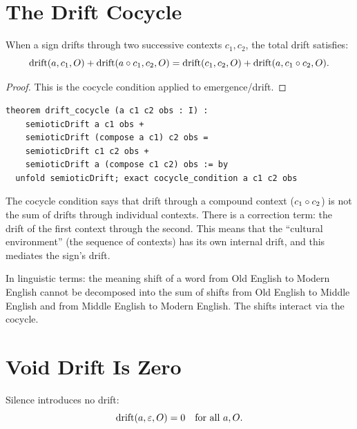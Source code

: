 \section{The Drift Cocycle}

\begin{theorem}
\label{thm:drift-cocycle}
When a sign drifts through two successive contexts $c_1, c_2$,
the total drift satisfies:
\[
  \mathrm{drift}(a, c_1, O) + \mathrm{drift}(a \circ c_1, c_2, O)
  = \mathrm{drift}(c_1, c_2, O) + \mathrm{drift}(a, c_1 \circ c_2, O).
\]
\end{theorem}

\begin{proof}
This is the cocycle condition applied to emergence/drift.
\end{proof}

\begin{lstlisting}
theorem drift_cocycle (a c1 c2 obs : I) :
    semioticDrift a c1 obs +
    semioticDrift (compose a c1) c2 obs =
    semioticDrift c1 c2 obs +
    semioticDrift a (compose c1 c2) obs := by
  unfold semioticDrift; exact cocycle_condition a c1 c2 obs
\end{lstlisting}

\begin{interpretation}
The cocycle condition says that drift through a compound context
($c_1 \circ c_2$) is not the sum of drifts through individual
contexts.  There is a correction term: the drift of the first context
through the second.  This means that the ``cultural environment''
(the sequence of contexts) has its own internal drift, and this
mediates the sign's drift.

In linguistic terms: the meaning shift of a word from Old English to
Modern English cannot be decomposed into the sum of shifts from Old
English to Middle English and from Middle English to Modern English.
The shifts interact via the cocycle.
\end{interpretation}

\section{Void Drift Is Zero}

\begin{theorem}
\label{thm:void-drift}
Silence introduces no drift:
\[
  \mathrm{drift}(a, \varepsilon, O) = 0 \quad \text{for all } a, O.
\]
\end{theorem}

